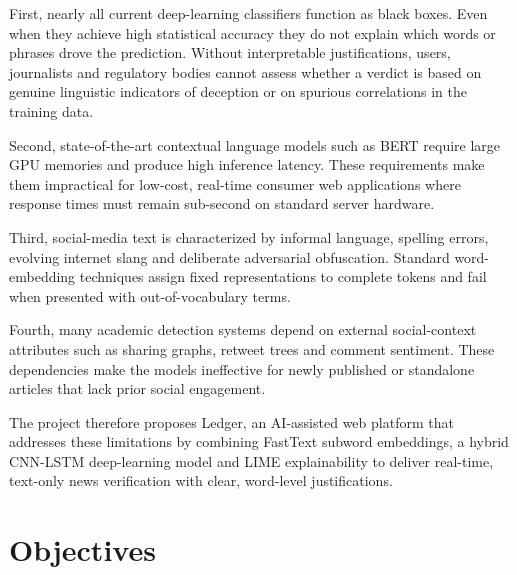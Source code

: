 \documentclass[12pt,a4paper,oneside]{report}
\begin{document}
First, nearly all current deep-learning classifiers function as black boxes. Even when
they achieve high statistical accuracy they do not explain which words or phrases drove
the prediction. Without interpretable justifications, users, journalists and regulatory
bodies cannot assess whether a verdict is based on genuine linguistic indicators of
deception or on spurious correlations in the training data.

Second, state-of-the-art contextual language models such as BERT require large GPU
memories and produce high inference latency. These requirements make them impractical
for low-cost, real-time consumer web applications where response times must remain
sub-second on standard server hardware.

Third, social-media text is characterized by informal language, spelling errors, evolving
internet slang and deliberate adversarial obfuscation. Standard word-embedding
techniques assign fixed representations to complete tokens and fail when presented with
out-of-vocabulary terms.

Fourth, many academic detection systems depend on external social-context attributes
such as sharing graphs, retweet trees and comment sentiment. These dependencies make the
models ineffective for newly published or standalone articles that lack prior social
engagement.

The project therefore proposes Ledger, an AI-assisted web platform that addresses these
limitations by combining FastText subword embeddings, a hybrid CNN-LSTM deep-learning
model and LIME explainability to deliver real-time, text-only news verification with
clear, word-level justifications.

\section{Objectives}
\end{document}
